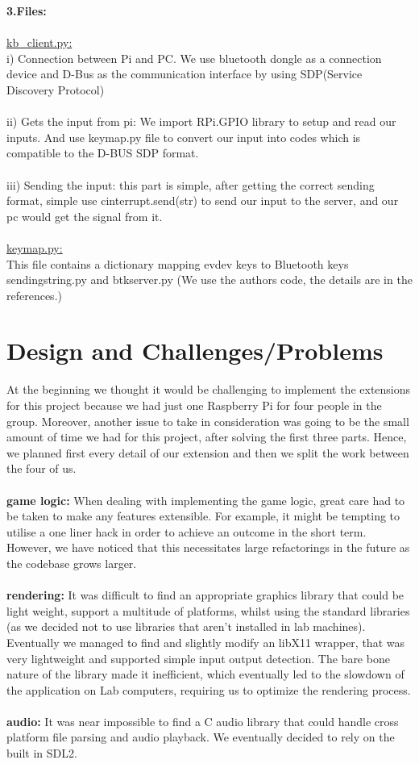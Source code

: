 \documentclass[a4paper]{article}
\begin{document}
\textbf{3.Files:} \\\\
\underline{kb\_client.py:}\\
\quad  i) Connection between Pi and PC. We use bluetooth dongle as a connection device and D-Bus as the communication interface by using SDP(Service Discovery Protocol)
\\\\
ii) Gets the input from pi: We import RPi.GPIO library to setup and read our inputs. And use keymap.py file to convert our input into codes which is compatible to the D-BUS SDP format.
\\\\
iii) Sending the input:	this part is simple, after getting the correct sending format, simple use cinterrupt.send(str) to send our input to the server, and our pc would get the signal from it.
\\\\
\underline{keymap.py:} \\This file contains a dictionary mapping evdev keys to Bluetooth keys 
sendingstring.py and btkserver.py (We use the authors code, the details are in the references.)
\section{Design and Challenges/Problems}
At the beginning we thought it would be challenging to implement the extensions for this project because we had just one Raspberry Pi for four people in the group. 
Moreover, another issue to take in consideration was going to be the small amount of time we had for this project, after solving the first three parts. Hence, we planned first every detail of our extension and then we split the work between the four of us.
\\\\
\textbf{game logic:} When dealing with implementing the game logic, great care had to be taken to make any features extensible. For example, it might be tempting to utilise a one liner hack in order to achieve an outcome in the short term. However, we have noticed that this necessitates large refactorings in the future as the codebase grows larger.
\\\\
\textbf{rendering:} It was difficult to find an appropriate graphics library that could be light weight, support a multitude of platforms, whilst using the standard libraries (as we decided not to use libraries that aren't installed in lab machines). Eventually we managed to find and slightly modify an libX11 wrapper, that was very lightweight and supported simple input output detection. The bare bone nature of the library made it inefficient, which eventually led to the slowdown of the application on Lab computers, requiring us to optimize the rendering process. 
\\\\
\textbf{audio:} It was near impossible to find a C audio library that could handle cross platform file parsing and audio playback. We eventually decided to rely on the built in SDL2.
\end{document}
